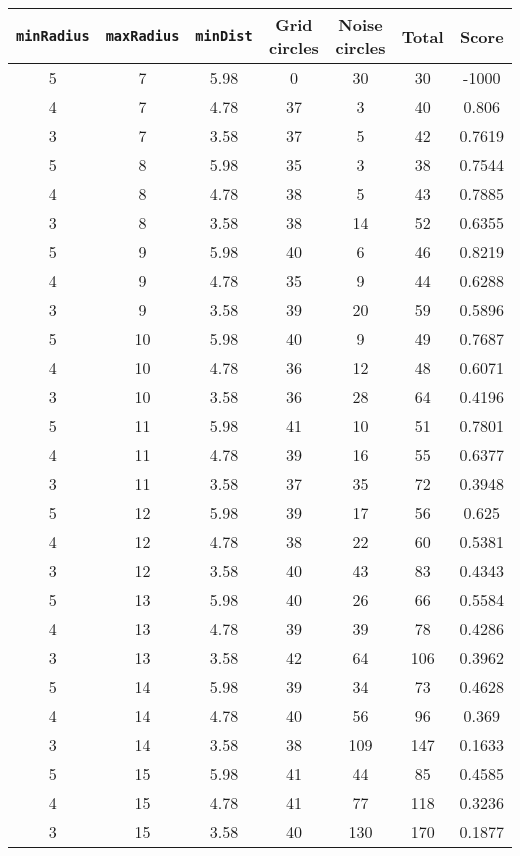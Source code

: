 \documentclass[letterpaper, 12pt]{article}
\begin{document}
\begin{longtable}{|c|c|c|c|c|c|c|}
\hline
\textbf{\texttt{minRadius}} & \textbf{\texttt{maxRadius}} & \textbf{\texttt{minDist}} & \textbf{Grid circles} & \textbf{Noise circles} & \textbf{Total} & \textbf{Score} \\
\hline
5 & 7 & 5.98 & 0 & 30 & 30 & -1000 \\
\hline
4 & 7 & 4.78 & 37 & 3 & 40 & 0.806 \\
\hline
3 & 7 & 3.58 & 37 & 5 & 42 & 0.7619 \\
\hline
5 & 8 & 5.98 & 35 & 3 & 38 & 0.7544 \\
\hline
4 & 8 & 4.78 & 38 & 5 & 43 & 0.7885 \\
\hline
3 & 8 & 3.58 & 38 & 14 & 52 & 0.6355 \\
\hline
5 & 9 & 5.98 & 40 & 6 & 46 & 0.8219 \\
\hline
4 & 9 & 4.78 & 35 & 9 & 44 & 0.6288 \\
\hline
3 & 9 & 3.58 & 39 & 20 & 59 & 0.5896 \\
\hline
5 & 10 & 5.98 & 40 & 9 & 49 & 0.7687 \\
\hline
4 & 10 & 4.78 & 36 & 12 & 48 & 0.6071 \\
\hline
3 & 10 & 3.58 & 36 & 28 & 64 & 0.4196 \\
\hline
5 & 11 & 5.98 & 41 & 10 & 51 & 0.7801 \\
\hline
4 & 11 & 4.78 & 39 & 16 & 55 & 0.6377 \\
\hline
3 & 11 & 3.58 & 37 & 35 & 72 & 0.3948 \\
\hline
5 & 12 & 5.98 & 39 & 17 & 56 & 0.625 \\
\hline
4 & 12 & 4.78 & 38 & 22 & 60 & 0.5381 \\
\hline
3 & 12 & 3.58 & 40 & 43 & 83 & 0.4343 \\
\hline
5 & 13 & 5.98 & 40 & 26 & 66 & 0.5584 \\
\hline
4 & 13 & 4.78 & 39 & 39 & 78 & 0.4286 \\
\hline
3 & 13 & 3.58 & 42 & 64 & 106 & 0.3962 \\
\hline
5 & 14 & 5.98 & 39 & 34 & 73 & 0.4628 \\
\hline
4 & 14 & 4.78 & 40 & 56 & 96 & 0.369 \\
\hline
3 & 14 & 3.58 & 38 & 109 & 147 & 0.1633 \\
\hline
5 & 15 & 5.98 & 41 & 44 & 85 & 0.4585 \\
\hline
4 & 15 & 4.78 & 41 & 77 & 118 & 0.3236 \\
\hline
3 & 15 & 3.58 & 40 & 130 & 170 & 0.1877 \\

\end{longtable}
\end{document}
